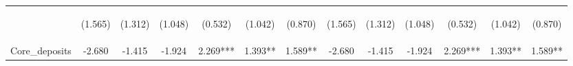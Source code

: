 \documentclass[]{article}
\begin{document}
\begin{center}
\begin{tabular}{lcccccccccccc}
\vspace{4pt} & \begin{footnotesize}(1.565)\end{footnotesize} & \begin{footnotesize}(1.312)\end{footnotesize} & \begin{footnotesize}(1.048)\end{footnotesize} & \begin{footnotesize}(0.532)\end{footnotesize} & \begin{footnotesize}(1.042)\end{footnotesize} & \begin{footnotesize}(0.870)\end{footnotesize} & \begin{footnotesize}(1.565)\end{footnotesize} & \begin{footnotesize}(1.312)\end{footnotesize} & \begin{footnotesize}(1.048)\end{footnotesize} & \begin{footnotesize}(0.532)\end{footnotesize} & \begin{footnotesize}(1.042)\end{footnotesize} & \begin{footnotesize}(0.870)\end{footnotesize} \\
Core\_deposits & -2.680 & -1.415 & -1.924 & 2.269*** & 1.393** & 1.589** & -2.680 & -1.415 & -1.924 & 2.269*** & 1.393** & 1.589** \\

\end{tabular}
\end{center}
\end{document}
